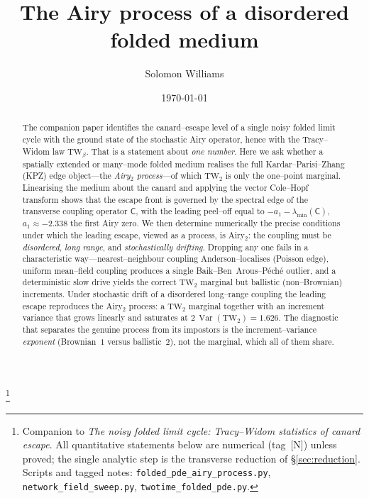 \documentclass[11pt,reqno]{amsart}
\theoremstyle{plain}
\theoremstyle{definition}
\theoremstyle{remark}
\newcommand{\TW}{\mathrm{TW}}
\newcommand{\Var}{\operatorname{Var}}
\newcommand{\Cmat}{\mathsf{C}}
\begin{document}
\title[The Airy process of a disordered folded medium]{The Airy process of a disordered
folded medium}
\author{Solomon Williams}
\address{School of Mathematics, University of Edinburgh}
\email{}
\thanks{Companion to \emph{The noisy folded limit cycle: Tracy--Widom statistics of
canard escape}. All quantitative statements below are numerical (tag~[N]) unless proved;
the single analytic step is the transverse reduction of \S\ref{sec:reduction}. Scripts and
tagged notes: \texttt{folded\_pde\_airy\_process.py}, \texttt{network\_field\_sweep.py},
\texttt{twotime\_folded\_pde.py}.}
\date{\today}

\begin{abstract}
The companion paper identifies the canard--escape level of a single noisy folded limit
cycle with the ground state of the stochastic Airy operator, hence with the Tracy--Widom
law $\TW_\beta$. That is a statement about \emph{one number}. Here we ask whether a
spatially extended or many--mode folded medium realises the full Kardar--Parisi--Zhang
(KPZ) edge object---the \emph{Airy$_2$ process}---of which $\TW_2$ is only the one--point
marginal. Linearising the medium about the canard and applying the vector Cole--Hopf
transform shows that the escape front is governed by the spectral edge of the transverse
coupling operator $\Cmat$, with the leading peel--off equal to $-a_1-\lambda_{\min}(\Cmat)$,
$a_1\approx-2.338$ the first Airy zero. We then determine numerically the precise
conditions under which the leading escape, viewed as a process, is Airy$_2$: the coupling
must be \emph{disordered}, \emph{long range}, and \emph{stochastically drifting}. Dropping
any one fails in a characteristic way---nearest--neighbour coupling Anderson--localises
(Poisson edge), uniform mean--field coupling produces a single Baik--Ben~Arous--P\'ech\'e
outlier, and a deterministic slow drive yields the correct $\TW_2$ marginal but ballistic
(non--Brownian) increments. Under stochastic drift of a disordered long--range coupling the
leading escape reproduces the Airy$_2$ process: a $\TW_2$ marginal together with an
increment variance that grows linearly and saturates at $2\,\Var(\TW_2)=1.626$. The
diagnostic that separates the genuine process from its impostors is the increment--variance
\emph{exponent} (Brownian~$1$ versus ballistic~$2$), not the marginal, which all of them
share.
\end{abstract}

\maketitle
\end{document}
